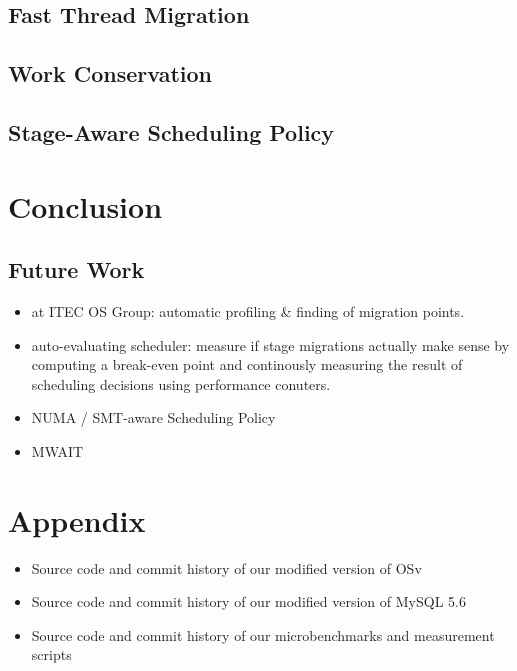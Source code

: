 \documentclass[12pt,a4paper]{article}
\begin{document}
\subsection{Fast Thread Migration}
\subsection{Work Conservation}
\subsection{Stage-Aware Scheduling Policy}

\section{Conclusion}
\subsection{Future Work}
\begin{itemize}
    \item at ITEC OS Group: automatic profiling \& finding of migration points.
    \item auto-evaluating scheduler: measure if stage migrations actually make sense by computing a break-even point and continously measuring the result of scheduling decisions using performance conuters.
    \item NUMA / SMT-aware Scheduling Policy
    \item MWAIT
\end{itemize}

\section{Appendix}

\begin{itemize}
    \item Source code and commit history of our modified version of OSv
    \item Source code and commit history of our modified version of MySQL 5.6
    \item Source code and commit history of our microbenchmarks and measurement scripts
\end{itemize}

\clearpage

\printbibliography
\end{document}
